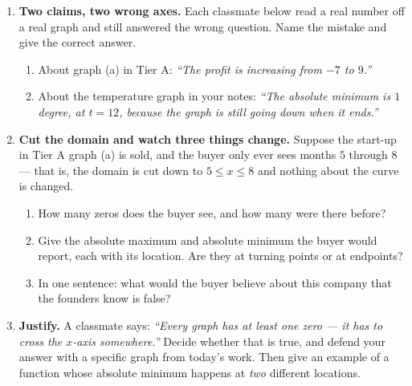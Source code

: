 \documentclass[10pt]{article}
\begin{document}
\boxguard[30]
\begin{tcolorbox}[colback=white, colframe=black!40, title=\textbf{Tier E --- Extension},
    fonttitle=\bfseries, arc=2mm, left=3mm, right=3mm, top=2mm, bottom=2mm, breakable]
\small

\begin{enumerate}[leftmargin=1.6em, itemsep=4pt, topsep=2pt]
  \item \textbf{Two claims, two wrong axes.} Each classmate below read a real number off a real
        graph and still answered the wrong question. Name the mistake and give the correct answer.
        \begin{enumerate}[label=(\alph*), leftmargin=1.6em, itemsep=3pt, topsep=3pt]
          \item About graph (a) in Tier A: \emph{``The profit is increasing from $-7$ to $9$.''}


          \item About the temperature graph in your notes: \emph{``The absolute minimum is $1$
                degree, at $t=12$, because the graph is still going down when it ends.''}

        \end{enumerate}

  \item \textbf{Cut the domain and watch three things change.} Suppose the start-up in Tier A graph
        (a) is sold, and the buyer only ever sees months $5$ through $8$ --- that is, the domain is
        cut down to $5 \le x \le 8$ and nothing about the curve is changed.
        \begin{enumerate}[label=(\alph*), leftmargin=1.6em, itemsep=3pt, topsep=3pt]
          \item How many zeros does the buyer see, and how many were there before?


          \item Give the absolute maximum and absolute minimum the buyer would report, each with its
                location. Are they at turning points or at endpoints?


          \item In one sentence: what would the buyer believe about this company that the founders
                know is false?

        \end{enumerate}

  \item \textbf{Justify.} A classmate says: \emph{``Every graph has at least one zero --- it has to
        cross the $x$-axis somewhere.''} Decide whether that is true, and defend your answer with a
        specific graph from today's work. Then give an example of a function whose absolute minimum
        happens at \emph{two} different locations.

\end{enumerate}
\end{tcolorbox}
\end{document}
